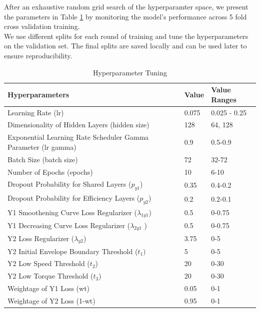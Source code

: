 \documentclass{report} %
\begin{document}
After an exhaustive random grid search of the hyperparamter space, we present the parameters in Table \ref{tab:Hyperparameter Tunings} by monitoring the model's performance across 5 fold cross validation training.\\
We use different splits for each round of training and tune the hyperparameters on the validation set. The final splits are saved locally and can be used later to ensure reproducibility. 

\begin{table}[H]
    \centering
    \begin{tabularx}{\linewidth}{|p{}|p{}|p{}|}
    \hline {\bf Hyperparameters} & {\bf Value} & {\bf Value Ranges}\\
    \hline 
    Learning Rate (lr) & 0.075 & 0.025 - 0.25\\
    Dimensionality of Hidden Layers (hidden size)& 128 & 64, 128\\
    Exponential Learning Rate Scheduler Gamma Parameter (lr gamma)& 0.9 & 0.5-0.9\\
    Batch Size (batch size)& 72 & 32-72\\
    Number of Epochs (epochs)& 10 & 6-10\\
    Dropout Probability for Shared Layers ($p_{y1}$)& 0.35 & 0.4-0.2\\
    Dropout Probability for Efficiency Layers ($p_{y2}$) & 0.2 & 0.2-0.1\\
    Y1 Smoothening Curve Loss Regularizer ($\lambda_{1y1}$) & 0.5 & 0-0.75\\
    Y1 Decreasing Curve Loss Regularizer ($\lambda_{2y1}$ )& 0.5 & 0-0.75\\
    Y2 Loss Regularizer ($\lambda_{y2}$) & 3.75 & 0-5\\
    Y2 Initial Envelope Boundary Threshold ($t_{1})$& 5 & 0-5\\
    Y2 Low Speed Threshold ($t_{2}$)& 20 & 0-30\\
    Y2 Low Torque Threshold ($t_{3}$)& 20 & 0-30\\
    Weightage of Y1 Loss (wt)& 0.05 & 0-1\\
    Weightage of Y2 Loss (1-wt)& 0.95 & 0-1\\
    \hline
    \end{tabularx}
    \caption{Hyperparameter Tuning}
    \label{tab:Hyperparameter Tunings}
\end{table}
\end{document}
